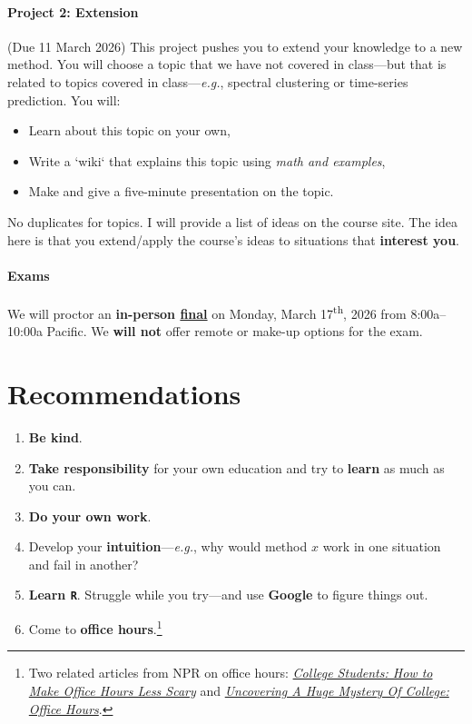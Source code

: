 \documentclass[10pt]{article}
\newcommand{\emf}[1]{\textbf{\textcolor{grass_green}{#1}}}
\begin{document}
\paragraph{Project 2: Extension} (Due 11 March 2026) This project pushes you to extend your knowledge to a new method. You will choose a topic that we have not covered in class---but that is related to topics covered in class---\textit{e.g.}, spectral clustering or time-series prediction. You will:
\begin{itemize}
  \item Learn about this topic on your own,
  \item Write a `wiki` that explains this topic using \textit{math and examples},
  \item Make and give a five-minute presentation on the topic.
\end{itemize}
No duplicates for topics. I will provide a list of ideas on the course site. The idea here is that you extend/apply the course's ideas to situations that \textbf{interest you}.

\paragraph{Exams} We will proctor an \emf{in-person \href{https://registrar.uoregon.edu/calendars/examinations}{final}} on Monday, March 17\textsuperscript{th}, 2026 from 8:00a--10:00a Pacific. We \textbf{will not} offer remote or make-up options for the exam.

\section*{Recommendations}

\begin{enumerate}
  \item \emf{Be kind}.
  \item \emf{Take responsibility} for your own education and try to \emf{learn} as much as you can.
  \item \emf{Do your own work}.
  \item Develop your \emf{intuition}---\textit{e.g.}, why would method $x$ work in one situation and fail in another?
  \item \emf{Learn \texttt{R}}. Struggle while you try---and use \emf{Google} to figure things out.
  \item Come to \emf{office hours}.\footnote{Two related articles from NPR on office hours: \href{https://www.npr.org/2019/10/05/678815966/college-students-how-to-make-office-hours-less-scary}{\textit{College Students: How to Make Office Hours Less Scary}} and \href{https://www.npr.org/2019/10/02/766568824/uncovering-a-huge-mystery-of-college-office-hours}{\textit{Uncovering A Huge Mystery Of College: Office Hours}}.}
\end{enumerate}
\end{document}
